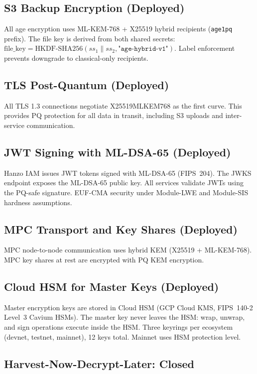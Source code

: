 \documentclass[11pt]{article}
\begin{document}
\subsection{S3 Backup Encryption (Deployed)}

All age encryption uses ML-KEM-768 + X25519 hybrid recipients
(\texttt{age1pq} prefix). The file key is derived from both shared
secrets: $\text{file\_key} = \text{HKDF-SHA256}(ss_1 \| ss_2,
\texttt{"age-hybrid-v1"})$. Label enforcement prevents downgrade to
classical-only recipients.

\subsection{TLS Post-Quantum (Deployed)}

All TLS 1.3 connections negotiate X25519MLKEM768 as the first curve.
This provides PQ protection for all data in transit, including S3
uploads and inter-service communication.

\subsection{JWT Signing with ML-DSA-65 (Deployed)}

Hanzo IAM issues JWT tokens signed with ML-DSA-65 (FIPS~204). The
JWKS endpoint exposes the ML-DSA-65 public key. All services validate
JWTs using the PQ-safe signature. EUF-CMA security under Module-LWE
and Module-SIS hardness assumptions.

\subsection{MPC Transport and Key Shares (Deployed)}

MPC node-to-node communication uses hybrid KEM (X25519 + ML-KEM-768).
MPC key shares at rest are encrypted with PQ KEM encryption.

\subsection{Cloud HSM for Master Keys (Deployed)}

Master encryption keys are stored in Cloud HSM (GCP Cloud KMS,
FIPS~140-2 Level~3 Cavium HSMs). The master key never leaves the HSM:
wrap, unwrap, and sign operations execute inside the HSM. Three
keyrings per ecosystem (devnet, testnet, mainnet), 12 keys total.
Mainnet uses HSM protection level.

\subsection{Harvest-Now-Decrypt-Later: Closed}
\end{document}
